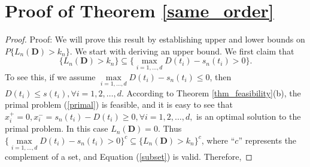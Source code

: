 \documentclass[final,11pt,3p]{article}\usepackage{setspace}
\begin{document}
\section{Proof of Theorem \ref{same_order} } \label{appendix: same_order}

\begin{proof}{Proof:}
	We will prove this result by establishing upper and lower bounds on $P\{L_n(\boldsymbol{D}) > k_n\}$. We start with deriving an upper bound. {{}} We first claim that
	\begin{equation}\label{subset}
	\{ L_n(\boldsymbol{D}) > k_n \} \subseteq \{ \max\limits_{i=1,\dots,d} D(t_i)-s_n(t_i) > 0 \}.
	\end{equation}
	To see this, if we assume $\max\limits_{i=1,\dots,d} D(t_i) -s_n(t_i) \le 0$, then $D(t_i) \le s(t_i), \forall i=1,2,\dots, d$. According to Theorem \ref{thm_feasibility}(b), the primal problem (\ref{primal}) is feasible, and it is easy to see that $x_i^+ = 0, x_i^- = s_n(t_i) - D(t_i) \ge 0, \forall i=1,2,\dots, d,$ is an optimal solution to the primal problem. In this case $L_n(\boldsymbol{D}) = 0$. Thus $\{ \max\limits_{i=1,\dots,d} D(t_i)-s_n(t_i) > 0 \}^c \subseteq \{ L_n(\boldsymbol{D}) > k_n \}^c$, where ``$c$'' represents the complement of a set, and Equation (\ref{subset}) is valid. Therefore,
{{}}	
	


\end{proof}
\end{document}
